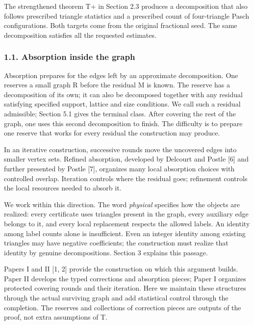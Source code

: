 \documentclass[english,11pt,a4paper]{article}
\begin{document}
The strengthened theorem T+ in Section 2.3 produces a decomposition that also follows prescribed triangle statistics and a prescribed count of four-triangle Pasch configurations. Both targets come from the original fractional seed. The same decomposition satisfies all the requested estimates.

\subsubsection{1.1. Absorption inside the graph}\label{absorption-inside-the-graph}

Absorption prepares for the edges left by an approximate decomposition. One reserves a small graph R before the residual M is known. The reserve has a decomposition of its own; it can also be decomposed together with any residual satisfying specified support, lattice and size conditions. We call such a residual admissible; Section 5.1 gives the terminal class. After covering the rest of the graph, one uses this second decomposition to finish. The difficulty is to prepare one reserve that works for every residual the construction may produce.

In an iterative construction, successive rounds move the uncovered edges into smaller vertex sets. Refined absorption, developed by Delcourt and Postle {[}6{]} and further presented by Postle {[}7{]}, organizes many local absorption choices with controlled overlap. Iteration controls where the residual goes; refinement controls the local resources needed to absorb it.

We work within this direction. The word \emph{physical} specifies how the objects are realized: every certificate uses triangles present in the graph, every auxiliary edge belongs to it, and every local replacement respects the allowed labels. An identity among label counts alone is insufficient. Even an integer identity among existing triangles may have negative coefficients; the construction must realize that identity by genuine decompositions. Section 3 explains this passage.

Papers I and II {[}1, 2{]} provide the construction on which this argument builds. Paper II develops the typed corrections and absorption pieces; Paper I organizes protected covering rounds and their iteration. Here we maintain these structures through the actual surviving graph and add statistical control through the completion. The reserves and collections of correction pieces are outputs of the proof, not extra assumptions of T.
\end{document}
